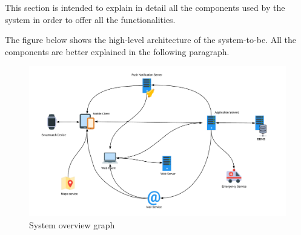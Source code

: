 This section is intended to explain in detail all the components used by the system in order to offer all the functionalities.

\noindent The figure below shows the high-level architecture of the system-to-be. 
All the components are better explained in the following paragraph.

\begin{figure}[H]
	\includegraphics[width=\textwidth,height=\textheight,keepaspectratio]{assets/ArchitecturalDesignOverview.pdf}
	\caption{System overview graph}
	\label{fig:SOG}
\end{figure}
